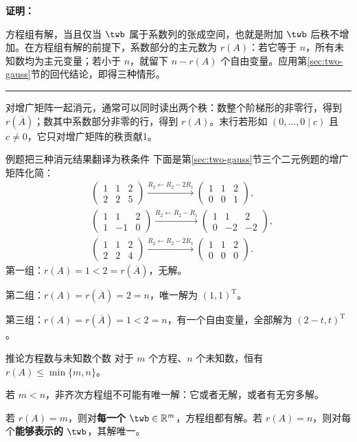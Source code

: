 \documentclass[a4paper,12pt,twoside,openany,fontset=none]{ctexbook}
\renewcommand{\le}{\leqslant}
\newenvironment{corollary}[1][]{\begin{thmBox}{推论}{#1}}{\end{thmBox}}
\newcounter{example}[chapter]
\newenvironment{example}[1][]{\begin{exBox}{例题}{#1}}{\end{exBox}}
\renewenvironment{proof}{
    \par\vspace{0.5em}\noindent
    \textbf{\color{LogicColor} 证明：}
}{
    \hfill \textcolor{LogicColor}{\rule{0.6em}{0.6em}} \par
}
\numberwithin{equation}{chapter}
\begin{document}
\begin{proof}
方程组有解，当且仅当 $\twb$ 属于系数列的张成空间，也就是附加 $\twb$ 后秩不增加。在方程组有解的前提下，系数部分的主元数为 $r(A)$：若它等于 $n$，所有未知数均为主元变量；若小于 $n$，就留下 $n-r(A)$ 个自由变量。应用第\ref{sec:two-gauss}节的回代结论，即得三种情形。
\end{proof}

对增广矩阵一起消元，通常可以同时读出两个秩：数整个阶梯形的非零行，得到 $r(\overline A)$；数其中系数部分非零的行，得到 $r(A)$。末行若形如 $(0,\ldots,0\mid c)$ 且 $c\ne0$，它只对增广矩阵的秩贡献1。

\begin{example}[把三种消元结果翻译为秩条件]
下面是第\ref{sec:two-gauss}节三个二元例题的增广矩阵化简：
\[
\begin{aligned}
 &\left(\begin{array}{rr|r}1&1&2\\2&2&5\end{array}\right)
 \xrightarrow{R_2\leftarrow R_2-2R_1}
 \left(\begin{array}{rr|r}1&1&2\\0&0&1\end{array}\right),\\[6pt]
 &\left(\begin{array}{rr|r}1&1&2\\1&-1&0\end{array}\right)
 \xrightarrow{R_2\leftarrow R_2-R_1}
 \left(\begin{array}{rr|r}1&1&2\\0&-2&-2\end{array}\right),\\[6pt]
 &\left(\begin{array}{rr|r}1&1&2\\2&2&4\end{array}\right)
 \xrightarrow{R_2\leftarrow R_2-2R_1}
 \left(\begin{array}{rr|r}1&1&2\\0&0&0\end{array}\right).
\end{aligned}
\]
第一组：$r(A)=1<2=r(\overline A)$，无解。

第二组：$r(A)=r(\overline A)=2=n$，唯一解为 $(1,1)^{\mathrm T}$。

第三组：$r(A)=r(\overline A)=1<2=n$，有一个自由变量，全部解为 $(2-t,t)^{\mathrm T}$。
\end{example}

\begin{corollary}[方程数与未知数个数]
对于 $m$ 个方程、$n$ 个未知数，恒有 $r(A)\le\min\{m,n\}$。

若 $m<n$，非齐次方程组不可能有唯一解：它或者无解，或者有无穷多解。

若 $r(A)=m$，则对\textbf{每一个} $\twb\in\mathbb R^m$，方程组都有解。若 $r(A)=n$，则对每个\textbf{能够表示的} $\twb$，其解唯一。
\end{corollary}
\end{document}
